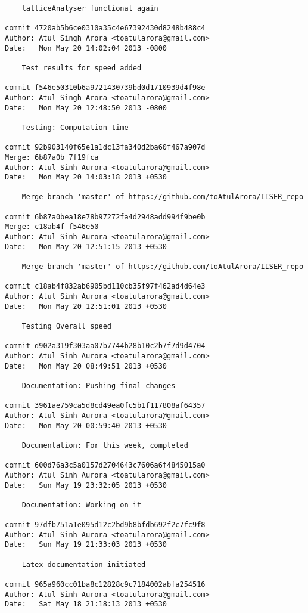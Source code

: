 \begin{lstlisting}
    latticeAnalyser functional again

commit 4720ab5b6ce0310a35c4e67392430d8248b488c4
Author: Atul Singh Arora <toatularora@gmail.com>
Date:   Mon May 20 14:02:04 2013 -0800

    Test results for speed added

commit f546e50310b6a9721430739bd0d1710939d4f98e
Author: Atul Singh Arora <toatularora@gmail.com>
Date:   Mon May 20 12:48:50 2013 -0800

    Testing: Computation time

commit 92b903140f65e1a1dc13fa340d2ba60f467a907d
Merge: 6b87a0b 7f19fca
Author: Atul Sinh Aurora <toatularora@gmail.com>
Date:   Mon May 20 14:03:18 2013 +0530

    Merge branch 'master' of https://github.com/toAtulArora/IISER_repo

commit 6b87a0bea18e78b97272fa4d2948add994f9be0b
Merge: c18ab4f f546e50
Author: Atul Sinh Aurora <toatularora@gmail.com>
Date:   Mon May 20 12:51:15 2013 +0530

    Merge branch 'master' of https://github.com/toAtulArora/IISER_repo

commit c18ab4f832ab6905bd110cb35f97f462ad4d64e3
Author: Atul Sinh Aurora <toatularora@gmail.com>
Date:   Mon May 20 12:51:01 2013 +0530

    Testing Overall speed

commit d902a319f303aa07b7744b28b10c2b7f7d9d4704
Author: Atul Sinh Aurora <toatularora@gmail.com>
Date:   Mon May 20 08:49:51 2013 +0530

    Documentation: Pushing final changes

commit 3961ae759ca5d8cd49ea0fc5b1f117808af64357
Author: Atul Sinh Aurora <toatularora@gmail.com>
Date:   Mon May 20 00:59:40 2013 +0530

    Documentation: For this week, completed

commit 600d76a3c5a0157d2704643c7606a6f4845015a0
Author: Atul Sinh Aurora <toatularora@gmail.com>
Date:   Sun May 19 23:32:05 2013 +0530

    Documentation: Working on it

commit 97dfb751a1e095d12c2bd9b8bfdb692f2c7fc9f8
Author: Atul Sinh Aurora <toatularora@gmail.com>
Date:   Sun May 19 21:33:03 2013 +0530

    Latex documentation initiated

commit 965a960cc01ba8c12828c9c7184002abfa254516
Author: Atul Sinh Aurora <toatularora@gmail.com>
Date:   Sat May 18 21:18:13 2013 +0530


\end{lstlisting}

